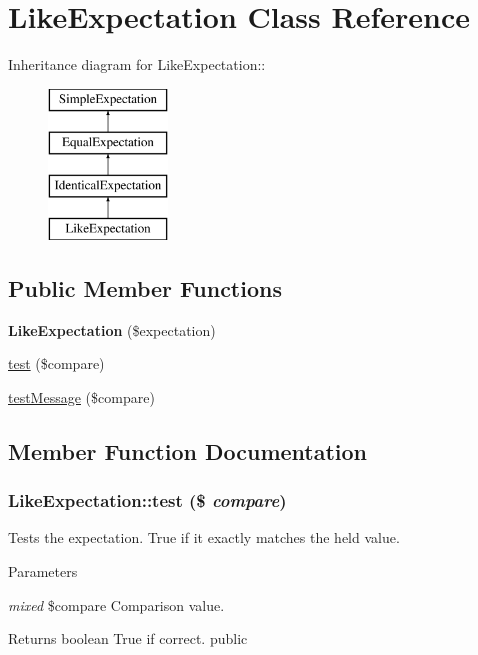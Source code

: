 \hypertarget{class_like_expectation}{
\section{LikeExpectation Class Reference}
\label{class_like_expectation}
}
Inheritance diagram for LikeExpectation::\begin{figure}[H]
\begin{center}
\leavevmode
\includegraphics[height=4cm]{class_like_expectation}
\end{center}
\end{figure}
\subsection*{Public Member Functions}
\begin{DoxyCompactItemize}
\item 
\hypertarget{class_like_expectation_a3f03fa808ec445d535e24e199edbdad5}{
{\bfseries LikeExpectation} (\$expectation)}
\label{class_like_expectation_a3f03fa808ec445d535e24e199edbdad5}

\item 
\hyperlink{class_like_expectation_a58e0a803b7016efd6516fea5d9753f82}{test} (\$compare)
\item 
\hyperlink{class_like_expectation_a421ebb1546193d32db6461d930150052}{testMessage} (\$compare)
\end{DoxyCompactItemize}


\subsection{Member Function Documentation}
\hypertarget{class_like_expectation_a58e0a803b7016efd6516fea5d9753f82}{
\subsubsection[{test}]{\setlength{\rightskip}{0pt plus 5cm}LikeExpectation::test (\$ {\em compare})}}
\label{class_like_expectation_a58e0a803b7016efd6516fea5d9753f82}
Tests the expectation. True if it exactly matches the held value. 
\begin{DoxyParams}{Parameters}
\item[{\em mixed}]\$compare Comparison value. \end{DoxyParams}
\begin{DoxyReturn}{Returns}
boolean True if correct.  public 
\end{DoxyReturn}


